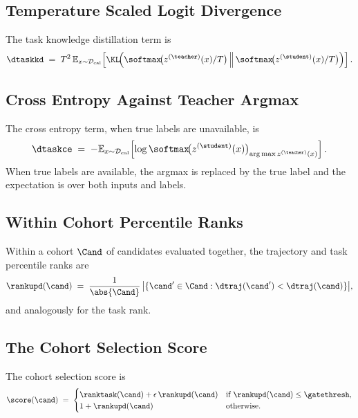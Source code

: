 \subsection{Temperature Scaled Logit Divergence}

The task knowledge distillation term is
\begin{equation}
\dtaskkd \;=\; T^2 \, \mathbb{E}_{x \sim \mathcal{D}_{\mathrm{cal}}} \!\left[ \KL\!\Big( \softmax\!\big(z^{(\teacher)}(x)/T\big) \,\Big\|\, \softmax\!\big(z^{(\student)}(x)/T\big) \Big) \right].
\end{equation}

\subsection{Cross Entropy Against Teacher Argmax}

The cross entropy term, when true labels are unavailable, is
\begin{equation}
\dtaskce \;=\; - \mathbb{E}_{x \sim \mathcal{D}_{\mathrm{cal}}} \!\left[ \log \softmax\!\big(z^{(\student)}(x)\big)_{\arg\max z^{(\teacher)}(x)} \right].
\end{equation}
When true labels are available, the argmax is replaced by the true label and the expectation is over both inputs and labels.

\subsection{Within Cohort Percentile Ranks}

Within a cohort $\Cand$ of candidates evaluated together, the trajectory and task percentile ranks are
\begin{equation}
\rankupd(\cand) \;=\; \frac{1}{\abs{\Cand}} \, \big| \{\cand' \in \Cand : \dtraj(\cand') < \dtraj(\cand)\} \big|,
\end{equation}
and analogously for the task rank.

\subsection{The Cohort Selection Score}

The cohort selection score is
\begin{equation}
\score(\cand) \;=\;
\begin{cases}
\ranktask(\cand) + \epsilon \, \rankupd(\cand) & \text{if } \rankupd(\cand) \le \gatethresh, \\
1 + \rankupd(\cand) & \text{otherwise.}
\end{cases}
\end{equation}

